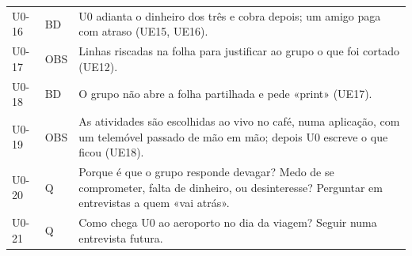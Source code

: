 \documentclass[11pt,a4paper]{article}
\begin{document}
{\begin{longtable}{@{}p{1.5cm}p{1.1cm}p{11.8cm}@{}}
U0-16 & BD & U0 adianta o dinheiro dos três e cobra depois; um amigo paga com atraso (UE15, UE16). \\
U0-17 & OBS & Linhas riscadas na folha para justificar ao grupo o que foi cortado (UE12). \\
U0-18 & BD & O grupo não abre a folha partilhada e pede «print» (UE17). \\
U0-19 & OBS & As atividades são escolhidas ao vivo no café, numa aplicação, com um telemóvel passado de mão em mão; depois U0 escreve o que ficou (UE18). \\
U0-20 & Q & Porque é que o grupo responde devagar? Medo de se comprometer, falta de dinheiro, ou desinteresse? Perguntar em entrevistas a quem «vai atrás». \\
U0-21 & Q & Como chega U0 ao aeroporto no dia da viagem? Seguir numa entrevista futura. \\
\bottomrule
\end{longtable}}
\end{document}
